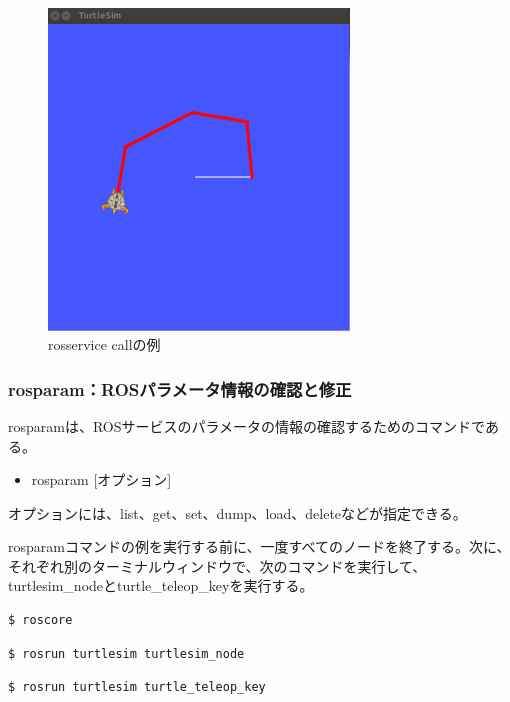\begin{figure}[h]
  \centering
  \includegraphics[width=8cm]{pictures/chapter4/pic_04_03.png}
  \caption{rosservice callの例}
\end{figure}

\subsubsection{rosparam：ROSパラメータ情報の確認と修正}

rosparamは、ROSサービスのパラメータの情報の確認するためのコマンドである。

\begin{itemize}
\item rosparam [オプション]
\end{itemize}

オプションには、list、get、set、dump、load、deleteなどが指定できる。

rosparamコマンドの例を実行する前に、一度すべてのノードを終了する。次に、それぞれ別のターミナルウィンドウで、次のコマンドを実行して、turtlesim\_nodeとturtle\_teleop\_keyを実行する。

\begin{lstlisting}[language=ROS]
$ roscore
\end{lstlisting}

\begin{lstlisting}[language=ROS]
$ rosrun turtlesim turtlesim_node
\end{lstlisting}

\begin{lstlisting}[language=ROS]
$ rosrun turtlesim turtle_teleop_key
\end{lstlisting}

